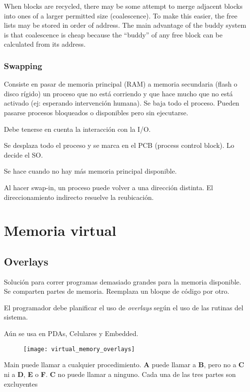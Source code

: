 \documentclass[a4paper, twoside]{article}
\begin{document}
When blocks are recycled, there may be some attempt to merge adjacent blocks into ones of a larger permitted size (coalescence). To make this easier, the free lists may be stored in order of address. The main advantage of the buddy system is that coalescence is cheap because the “buddy” of any free block can be calculated from its address.

\subsubsection{Swapping}
Consiste en pasar de memoria principal (RAM) a memoria secundaria (flash o disco rígido) un proceso que no está corriendo y que hace mucho que no está activado (ej: esperando intervención humana). Se baja todo el proceso. Pueden pasarse procesos bloqueados o disponibles pero sin ejecutarse.

Debe tenerse en cuenta la interacción con la I/O.

Se desplaza todo el proceso y se marca en el PCB (process control block). Lo decide el SO.

Se hace cuando no hay más memoria principal disponible. 

Al hacer swap-in, un proceso puede volver a una dirección distinta. El direccionamiento indirecto resuelve la reubicación.

\newpage
\section{Memoria virtual}
\subsection{Overlays}
Solución para correr programas demasiado grandes para la memoria disponible. Se comparten partes de memoria.
Reemplaza un bloque de código por otro.

El programador debe planificar el uso de \emph{overlays} según el uso de las rutinas del sistema.

Aún se usa en PDAs, Celulares y Embedded.

\begin{figure}[h]
	\centering
	\texttt{[image: virtual\_memory\_overlays]}
	\label{fig:virtual_memory_overlays}
\end{figure}

Main puede llamar a cualquier procedimiento.
\textbf{A} puede llamar a \textbf{B}, pero no a \textbf{C} ni a \textbf{D}, \textbf{E} o \textbf{F}. \textbf{C} no puede llamar a ninguno.
Cada una de las tres partes son excluyentes
\end{document}
